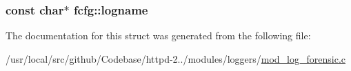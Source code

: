 \subsubsection[{\texorpdfstring{logname}{logname}}]{\setlength{\rightskip}{0pt plus 5cm}const char$\ast$ fcfg\+::logname}\hypertarget{structfcfg_aaba2969110d511bcb367726c42517bc6}{}\label{structfcfg_aaba2969110d511bcb367726c42517bc6}


The documentation for this struct was generated from the following file\+:\begin{DoxyCompactItemize}
\item 
/usr/local/src/github/\+Codebase/httpd-\/2../modules/loggers/\hyperlink{mod__log__forensic_8c}{mod\+\_\+log\+\_\+forensic.\+c}\end{DoxyCompactItemize}
